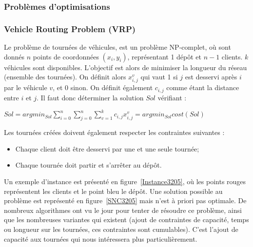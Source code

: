 \documentclass[a4paper,11pt]{article}%
\begin{document}
\subsubsection{Problèmes d'optimisations}

\subsubsection{Vehicle Routing Problem (VRP)}

Le problème de tournées de véhicules, est un problème NP-complet, où sont donnés $n$ points de coordonnées $(x_i,y_i)$, représentant 1 dépôt et $n-1$ clients. $k$ véhicules sont disponibles. 
L'objectif est alors de minimiser la longueur du réseau (ensemble des tournées). 
On définit alors $x_{i,j}^v$ qui vaut 1 si $j$ est desservi après $i$ par le véhicule $v$, et 0 sinon. 
On définit également $c_{i,j}$ comme étant la distance entre $i$ et $j$.
Il faut donc déterminer la solution $Sol$ vérifiant :
\begin{center}
$ Sol = argmin_{Sol} \sum_{i = 0}^{n} \sum_{j = 0}^{n} \sum_{v = 1}^{k} c_{i,j} x_{i,j}^v = argmin_{Sol}cost(Sol)$
\end{center}

Les tournées créées doivent également respecter les contraintes suivantes :
\begin{itemize}
\item Chaque client doit être desservi par une et une seule tournée;
\item Chaque tournée doit partir et s'arrêter au dépôt.
\end{itemize}

Un exemple d'instance est présenté en figure~\ref{Instance3205}, où les points rouges représentent les clients et le point bleu le dépôt. Une solution possible au problème est représenté en figure~\ref{SNC3205} mais n'est à priori pas optimale. 
De nombreux algorithmes ont vu le jour pour tenter de résoudre ce problème, ainsi que les nombreuses variantes qui existent (ajout de contraintes de capacité, temps ou longueur sur les tournées, ces contraintes sont cumulables). 
C'est l'ajout de capacité aux tournées qui nous intéressera plus particulièrement.
\end{document}
